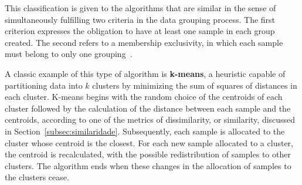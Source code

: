 \documentclass{ieeeaccess}
\begin{document}

\label{subsubsec:particionamento}

This classification is given to the algorithms that are similar in the sense of simultaneously fulfilling two criteria in the data grouping process. The first criterion expresses the obligation to have at least one sample in each group created. The second refers to a membership exclusivity, in which each sample must belong to only one grouping~\cite {xu2005survey, fahad2014survey}.

A classic example of this type of algorithm is \textbf{k-means}, a heuristic capable of partitioning data into $ k $ clusters by minimizing the sum of squares of distances in each cluster. K-means begins with the random choice of the centroids of each cluster followed by the calculation of the distance between each sample and the centroids, according to one of the metrics of dissimilarity, or similarity, discussed in Section~\ref{subsec:similaridade}. Subsequently, each sample is allocated to the cluster whose centroid is the closest. For each new sample allocated to a cluster, the centroid is recalculated, with the possible redistribution of samples to other clusters. The algorithm ends when these changes in the allocation of samples to the clusters cease.

\end{document}
